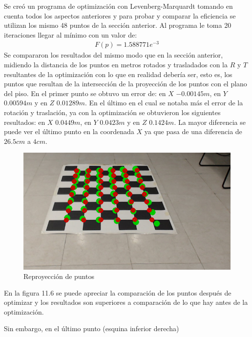        	Se creó un programa de optimización con Levenberg-Marquardt tomando en cuenta todos los aspectos anteriores y para probar y comparar la eficiencia se utilizan los mismo 48 puntos de la sección anterior. Al programa le toma 20 iteraciones llegar al mínimo con un valor de:
       	\begin{eqnarray}
       	F(p)=1.588771e^{-3}
       	\end{eqnarray}
       	Se compararon los resultados del mismo modo que en la sección anterior, midiendo la distancia de los puntos en metros rotados y trasladados con la $R$ y $T$ resultantes de la optimización con lo que en realidad debería ser, esto es, los puntos que resultan de la intersección de la proyección de los puntos con el plano del piso. En el primer punto se obtuvo un error de: en $X$ $-0.00145m$, en $Y$ $0.00594m$ y en $Z$ $0.01289m$. En el último en el cual se notaba más el error de la rotación y traslación, ya con la optimización se obtuvieron los siguientes resultados: en $X$ $0.0449m$, en $Y$ $0.0423m$ y en $Z$ $0.1424m$. La mayor diferencia se puede ver el último punto en la coordenada $X$ ya que pasa de una diferencia de $26.5cm$ a $4cm$.
       	\begin{figure}[htbp]
       		\centering
       		\includegraphics[width=.5\textwidth]{./pictures/conG0}
       		\caption{Reproyección de puntos}\label{fig: figura}
       	\end{figure}
       	En la figura 11.6 se puede apreciar la comparación de los puntos después de optimizar y los resultados son superiores a comparación de lo que hay antes de la optimización.
       	
       	 Sin embargo, en el último punto (esquina inferior derecha)
       	
